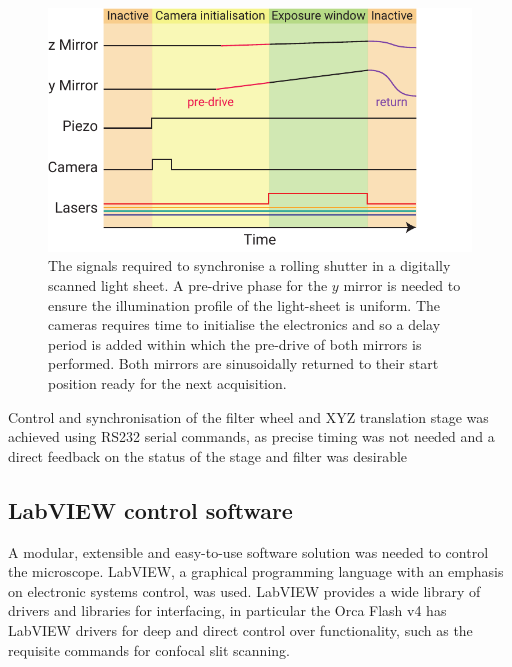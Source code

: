 \begin{figure}
  \centering
  \includegraphics{slit_signals}
  \caption{The signals required to synchronise a rolling shutter in a digitally scanned light sheet.
  A pre-drive phase for the \(y\) mirror is needed to ensure the illumination profile of the light-sheet is uniform.
  The cameras requires time to initialise the electronics and so a delay period is added within which the pre-drive of both mirrors is performed.
  Both mirrors are sinusoidally returned to their start position ready for the next acquisition.
  }\label{fig:slit_signals}
\end{figure}

Control and synchronisation of the filter wheel and XYZ translation stage was achieved using RS232 serial commands, as precise timing was not needed and a direct feedback on the status of the stage and filter was desirable %

%



\subsection{LabVIEW control software}

A modular, extensible and easy-to-use software solution was needed to control the microscope.
LabVIEW, a graphical programming language with an emphasis on electronic systems control, was used.
LabVIEW provides a wide library of drivers and libraries for interfacing, in particular the Orca Flash v4 has LabVIEW drivers for deep and direct control over functionality, such as the requisite commands for confocal slit scanning.

